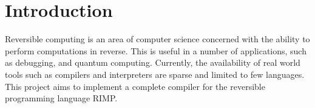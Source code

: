 \chapter*{Introduction}

Reversible computing is an area of computer science concerned with the ability to perform computations in reverse\cite{IntroductionToReversibleComputingBook, LogicalReversibility, richardpFeynmanLecturesComputation2018}.
This is useful in a number of applications, such as debugging, and quantum computing\cite{richardpFeynmanLecturesComputation2018, debug, ReversiblePrologDebugger}.
Currently, the availability of real world tools such as compilers and interpreters are sparse and limited to few languages.
This project aims to implement a complete compiler for the reversible programming language RIMP\cite{RIMP}.

